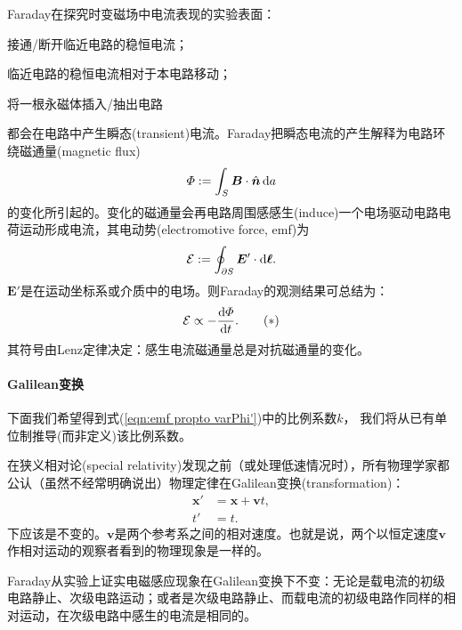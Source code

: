 Faraday在探究时变磁场中电流表现的实验表面：
\begin{compactenum}
    \item 接通/断开临近电路的稳恒电流；
    \item 临近电路的稳恒电流相对于本电路移动；
    \item 将一根永磁体插入/抽出电路
\end{compactenum}
都会在电路中产生瞬态(transient)电流。Faraday把瞬态电流的产生解释为电路环绕磁通量(magnetic flux)%
\begin{equation}
    \varPhi:=\int_S\bm B\cdot\mathop{}\!\hat{\bm n}\mathop{}\!\mathrm{d} a
\end{equation}
的变化所引起的。变化的磁通量会再电路周围感感生(induce)一个电场驱动电路电荷运动形成电流，其电动势(electromotive force, emf)为
\begin{equation}
    \mathcal{E}:=\oint_{\partial S}\bm E'\cdot\mathop{}\!\mathrm{d}\bm \ell.
\end{equation}
$\bm E'$是在运动坐标系或介质中的电场。则Faraday的观测结果可总结为：
\begin{equation}
    \label{eqn:emf propto varPhi'}
    \mathcal{E}\propto-\frac{\mathrm{d}^{\;\!\!}\varPhi}{\mathrm{d} t^{\;\!\!}}.
    \tag{$\ast$}
\end{equation}
其符号由Lenz定律决定：感生电流磁通量总是对抗磁通量的变化。
\paragraph{Galilean变换}
下面我们希望得到式(\ref{eqn:emf propto varPhi'})中的比例系数$k$，%
我们将从已有单位制推导(而非定义)该比例系数。

在狭义相对论(special relativity)发现之前（或处理低速情况时），所有物理学家都公认（虽然不经常明确说出）物理定律在Galilean变换(transformation)：
\begin{align*}
    \bm x'&=\bm x+\bm vt,\\
    t'&=t.
\end{align*}
下应该是不变的。$\bm v$是两个参考系之间的相对速度。也就是说，两个以恒定速度$\bm v$作相对运动的观察者看到的物理现象是一样的。%

Faraday从实验上证实电磁感应现象在Galilean变换下不变：无论是载电流的初级电路静止、次级电路运动；或者是次级电路静止、而载电流的初级电路作同样的相对运动，在次级电路中感生的电流是相同的。

